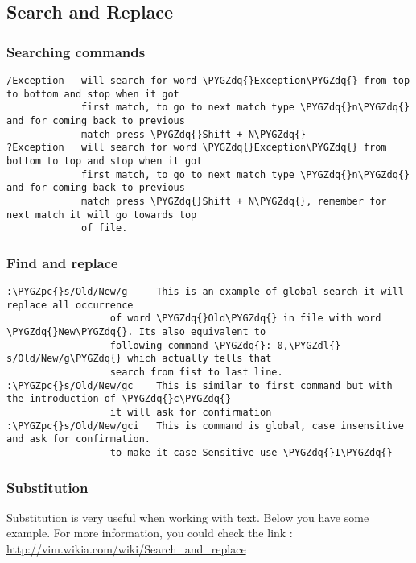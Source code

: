\documentclass[letterpaper,10pt,english]{sphinxmanual}
\def\PYGZpc{\char`\%}
\def\PYGZdl{\char`\$}
\def\PYGZdq{\char`\"}
\begin{document}
\subsection{Search and Replace}
\label{editor/vim:search-and-replace}

\subsubsection{Searching commands}
\label{editor/vim:searching-commands}
\begin{Verbatim}[commandchars=\\\{\}]
/Exception   will search for word \PYGZdq{}Exception\PYGZdq{} from top to bottom and stop when it got
             first match, to go to next match type \PYGZdq{}n\PYGZdq{} and for coming back to previous
             match press \PYGZdq{}Shift + N\PYGZdq{}
?Exception   will search for word \PYGZdq{}Exception\PYGZdq{} from bottom to top and stop when it got
             first match, to go to next match type \PYGZdq{}n\PYGZdq{} and for coming back to previous
             match press \PYGZdq{}Shift + N\PYGZdq{}, remember for next match it will go towards top
             of file.
\end{Verbatim}


\subsubsection{Find and replace}
\label{editor/vim:find-and-replace}
\begin{Verbatim}[commandchars=\\\{\}]
:\PYGZpc{}s/Old/New/g     This is an example of global search it will replace all occurrence
                  of word \PYGZdq{}Old\PYGZdq{} in file with word \PYGZdq{}New\PYGZdq{}. Its also equivalent to
                  following command \PYGZdq{}: 0,\PYGZdl{} s/Old/New/g\PYGZdq{} which actually tells that
                  search from fist to last line.
:\PYGZpc{}s/Old/New/gc    This is similar to first command but with the introduction of \PYGZdq{}c\PYGZdq{}
                  it will ask for confirmation
:\PYGZpc{}s/Old/New/gci   This is command is global, case insensitive and ask for confirmation.
                  to make it case Sensitive use \PYGZdq{}I\PYGZdq{}
\end{Verbatim}


\subsubsection{Substitution}
\label{editor/vim:substitution}
Substitution is very useful when working with text. Below you have some example. For more information, you could check the link : \href{http://vim.wikia.com/wiki/Search\_and\_replace}{http://vim.wikia.com/wiki/Search\_and\_replace}
\end{document}
